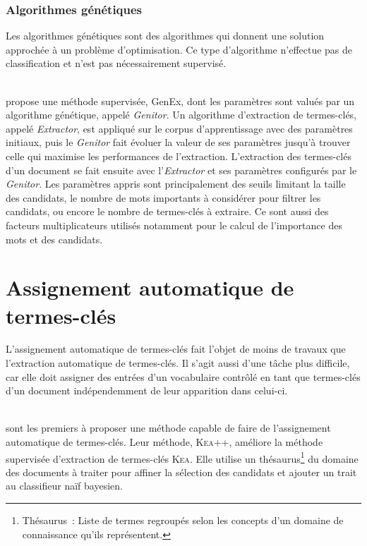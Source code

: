       \subsubsection{Algorithmes génétiques}
      \label{subsubsec:main-state_of_the_art-automatic_keyphrase_extraction-supervised_keyphrase_extraction-genex}
        Les algorithmes génétiques sont des algorithmes qui donnent une solution
        approchée à un problème d'optimisation. Ce type d'algorithme
        n'effectue pas de classification et n'est pas nécessairement supervisé.

        ~\\ propose une méthode
        supervisée, GenEx, dont les paramètres sont valués par un algorithme
        génétique, appelé \textit{Genitor}. Un algorithme d'extraction de
        termes-clés, appelé \textit{Extractor}, est appliqué sur le corpus
        d'apprentissage avec des paramètres initiaux, puis le \textit{Genitor}
        fait évoluer la valeur de ses paramètres jusqu'à trouver celle qui
        maximise les performances de l'extraction. L'extraction des termes-clés
        d'un document se fait ensuite avec l'\textit{Extractor} et ses
        paramètres configurés par le \textit{Genitor}. Les paramètres appris
        sont principalement des seuils limitant la taille des candidats, le
        nombre de mots importants à considérer pour filtrer les candidats, ou
        encore le nombre de termes-clés à extraire. Ce sont aussi des facteurs
        multiplicateurs utilisés notamment pour le calcul de l'importance des
        mots et des candidats.

  \section{Assignement automatique de termes-clés}
  \label{sec:main-state_of_the_art-automatic_keyphrase_assignment}
    L'assignement automatique de termes-clés fait l'objet de moins de travaux
    que l'extraction automatique de termes-clés. Il s'agit aussi d'une tâche
    plus difficile, car elle doit assigner des entrées d'un vocabulaire contrôlé
    en tant que termes-clés d'un document indépendemment de leur apparition dans
    celui-ci.

    ~\\ sont les premiers à proposer une
    méthode capable de faire de l'assignement automatique de termes-clés. Leur
    méthode, \textsc{Kea}++, améliore la méthode supervisée d'extraction de
    termes-clés \textsc{Kea}. Elle utilise un thésaurus\footnote{Thésaurus~:
    Liste de termes regroupés selon les concepts d'un domaine de connaissance
    qu'ils représentent.} du domaine des documents à traiter pour affiner la
    sélection des candidats et ajouter un trait au classifieur naïf bayesien.

